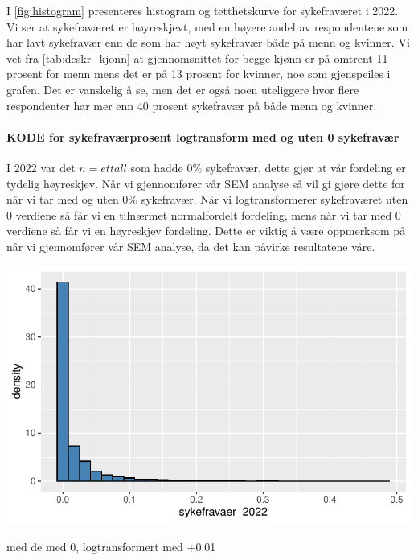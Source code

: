 \documentclass[
  12pt,
  a4paper,
  DIV=11,
  numbers=noendperiod]{scrartcl}
\let\oldparagraph\paragraph
\renewcommand{\paragraph}[1]{\oldparagraph{#1}\mbox{}}
\begin{document}
I \autoref{fig:histogram} presenteres histogram og tetthetskurve for
sykefraværet i 2022. Vi ser at sykefraværet er høyreskjevt, med en
høyere andel av respondentene som har lavt sykefravær enn de som har
høyt sykefravær både på menn og kvinner. Vi vet fra
\autoref{tab:deskr_kjonn} at gjennomsnittet for begge kjønn er på
omtrent 11 prosent for menn mens det er på 13 prosent for kvinner, noe
som gjenspeiles i grafen. Det er vanskelig å se, men det er også noen
uteliggere hvor flere respondenter har mer enn 40 prosent sykefravær på
både menn og kvinner.

\paragraph{KODE for sykefraværprosent logtransform med og uten 0
sykefravær}\label{kode-for-sykefravuxe6rprosent-logtransform-med-og-uten-0-sykefravuxe6r}

I 2022 var det \(n=et tall\) som hadde 0\% sykefravær, dette gjør at vår
fordeling er tydelig høyreskjev. Når vi gjennomfører vår SEM analyse så
vil gi gjøre dette for når vi tar med og uten 0\% sykefravær. Når vi
logtransformerer sykefraværet uten 0 verdiene så får vi en tilnærmet
normalfordelt fordeling, mens når vi tar med 0 verdiene så får vi en
høyreskjev fordeling. Dette er viktig å være oppmerksom på når vi
gjennomfører vår SEM analyse, da det kan påvirke resultatene våre.

\includegraphics{kand_SOK2209_Bacheloroppgave_V25_files/figure-pdf/unnamed-chunk-9-1.pdf}

med de med 0, logtransformert med +0.01
\end{document}
